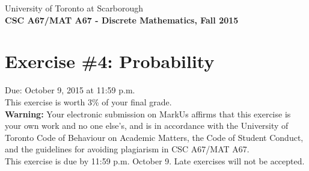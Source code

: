 \documentclass{article}
\begin{document}
{\large \noindent{}University of Toronto at Scarborough\\
\textbf{CSC A67/MAT A67 - Discrete Mathematics, Fall 2015}}

\section*{\huge Exercise \#4: Probability}

{\large Due: October 9, 2015 at 11:59 p.m.\\
This exercise is worth 3\% of your final grade.}\\[1em]
\textbf{Warning:} Your electronic submission on MarkUs affirms that this exercise is your own work and no
one else's, and is in accordance with the University of Toronto Code of Behaviour on Academic Matters,
the Code of Student Conduct, and the guidelines for avoiding plagiarism in CSC A67/MAT A67.\\[1ex]
This exercise is due by 11:59 p.m. October 9. Late exercises will not be accepted.\\[1ex]
\renewcommand{\labelenumi}{\arabic{enumi}.}
\renewcommand{\labelenumii}{(\alph{enumii})}
\end{document}

